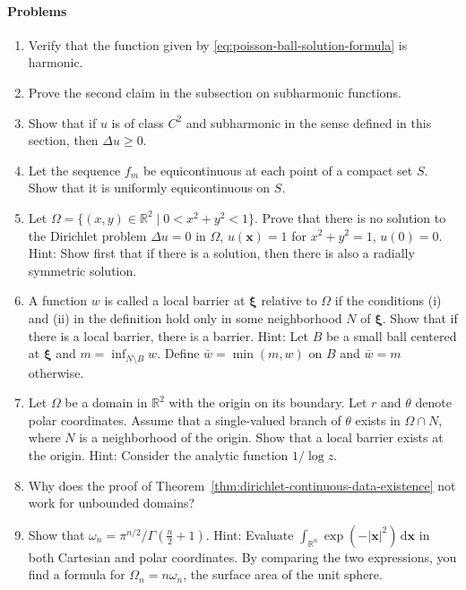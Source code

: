 \paragraph*{Problems}

\begin{enumerate}[label=\thesection.\arabic*.,ref=\thesection.\arabic*,start=8,series=book-problems]

\item\label{ex:poisson-formula-harmonicity} Verify that the function given by \eqref{eq:poisson-ball-solution-formula} is harmonic.

\item\label{ex:subharmonic-harmonic-lifting} Prove the second claim in the subsection on subharmonic functions.

\item\label{ex:smooth-subharmonic-laplacian} Show that if $u$ is of class $C^2$ and subharmonic in the sense defined in this section, then $\Delta u\geq0$.

\item\label{ex:compact-equicontinuity-uniform} Let the sequence $f_m$ be equicontinuous at each point of a compact set $S$. Show that it is uniformly equicontinuous on $S$.

\item\label{ex:punctured-disk-dirichlet-nonexistence} Let $\Omega=\{(x,y)\in\mathbb{R}^2\mid0<x^2+y^2<1\}$. Prove that there is no solution to the Dirichlet problem $\Delta u=0$ in $\Omega$, $u(\bm{x})=1$ for $x^2+y^2=1$, $u(0)=0$. Hint: Show first that if there is a solution, then there is also a radially symmetric solution.

\item\label{ex:local-barrier-to-global-barrier} A function $w$ is called a local barrier at $\bm{\xi}$ relative to $\Omega$ if the conditions (i) and (ii) in the definition hold only in some neighborhood $N$ of $\bm{\xi}$. Show that if there is a local barrier, there is a barrier. Hint: Let $B$ be a small ball centered at $\bm{\xi}$ and $m=\inf_{N\setminus B}w$. Define $\bar w=\min(m,w)$ on $B$ and $\bar w=m$ otherwise.

\item\label{ex:planar-local-logarithmic-barrier} Let $\Omega$ be a domain in $\mathbb{R}^2$ with the origin on its boundary. Let $r$ and $\theta$ denote polar coordinates. Assume that a single-valued branch of $\theta$ exists in $\Omega\cap N$, where $N$ is a neighborhood of the origin. Show that a local barrier exists at the origin. Hint: Consider the analytic function $1/\log z$.

\item\label{ex:perron-proof-unbounded-domain} Why does the proof of Theorem~\ref{thm:dirichlet-continuous-data-existence} not work for unbounded domains?

\item\label{ex:unit-ball-volume-gamma-function} Show that $\omega_n=\pi^{n/2}/\Gamma(\frac n2+1)$. Hint: Evaluate \allowbreak $\int_{\mathbb{R}^n}\exp(-|\bm{x}|^2)\,\mathrm{d}\bm{x}$ in both Cartesian and polar coordinates. By comparing the two expressions, you find a formula for $\Omega_n=n\omega_n$, the surface area of the unit sphere.

\end{enumerate}
